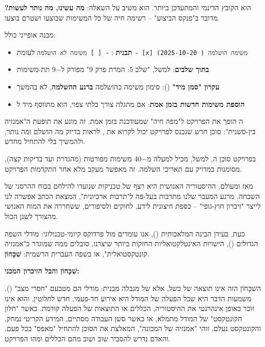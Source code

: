 
\textbf{} הוא הקובץ הדינמי והמתעדכן ביותר. הוא משיב על השאלה: \textbf{מה עשינו, מה נותר לעשות?} מדובר ב"פנקס הביצוע" – רשימה חיה של כל המשימות שבוצעו ושטרם בוצעו.

מבנה אופייני כולל:
\begin{itemize}
  \item \textbf{תבנית }: \texttt{- [ ] משימה לא הושלמה} לעומת \texttt{- [x] משימה הושלמה (\checkmark{} 2025-10-20)}
  \item \textbf{ בתוך שלבים}: למשל, "שלב \num{5}: המרת פרק \num{9}" מפורק ל\num{-9} תת-משימות
  \item \textbf{עקרון "סמן מיד"} (): סימון משימה כהושלמה \textbf{ברגע ההשלמה}, לא בהמשך
  \item \textbf{הוספת משימות חדשות בזמן אמת}: אם מתגלה צורך בלתי צפוי, הוא מתווסף מיד ל
\end{itemize}

ה הופך את הפרויקט ל"מפה חיה" שמעודכנת בזמן אמת. זה מונע את תופעת ה"אמנזיה בין-סשנית": סוכן חדש שנכנס לפרויקט יכול לקרוא את , לראות בדיוק מה הושלם ומה נותר, ולהמשיך בלי להתחיל מחדש.

בפרויקט סוכן ה, למשל,  מכיל למעלה מ\num{-40} משימות מפורטות (מהגדרת  ועד בדיקות קצה), מסומנות במדויק עם תאריכי השלמה. זה מאפשר מעקב מלא אחר התקדמות הפרויקט.


מאז ומעולם, ההיסטוריה האנושית היא רצף של טכניקות שנועדו להילחם בכוח ההרסני של השכחה. מרגע המעבר שלנו מתרבות בעל-פה ל"תרבות ארכיונית", המצאת הכתב אפשרה לנו לייצר "זיכרון חוץ-גופי" – כספת חיצונית לידע, לחוקים ולסיפורים, ששחררה את המוח האנושי מהצורך לשנן הכול.

כעת, בעידן הבינה המלאכותית (), אנו עומדים מול פרדוקס קיומי-טכנולוגי: מודלי השפה הגדולים (), הישויות האינטלקטואליות החזקות ביותר שיצרנו, סובלים ממה שמוגדר כ"אמנזיה קונטקסטואלית", או בשפה העברית הרשמית: \textbf{שִׁכָּחוֹן}.

\textbf{שִׁכָּחוֹן והבל הזיכרון המכני:}

השִׁכָּחוֹן הזה אינו תוצאה של כשל, אלא של מגבלה מבנית: מודלי  הם מטבעם "חסרי מצב" (). משמעות הדבר היא שכל הפעלה של המודל היא אירוע חד-פעמי, חדש לחלוטין, והוא אינו זוכר באופן אינהרנטי את ההיסטוריה, הכללים או התוצאות של הפעלה קודמת. כאשר "חלון הקונטקסט" של המודל מתמלא, או כאשר סשן העבודה מסתיים, המידע הקריטי נמחק, והקונטקסט נעלם. זוהי "אמנזיה של המכונה", המאלצת את הסוכן להתחיל "מאפס" בכל פעם, והאדם נדרש להסביר שוב ושוב מהם הכללים ומהו הפרויקט.

